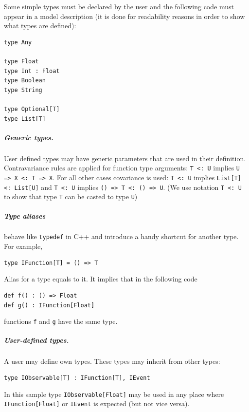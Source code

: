 \documentclass[a4paper,11pt]{article}
\begin{document}
Some simple types must be declared by the user and the following code
must appear in a model description (it is done for readability reasons
in order to show what types are defined):

\begin{verbatim}
type Any

type Float
type Int : Float
type Boolean
type String

type Optional[T]
type List[T]
\end{verbatim}

\subparagraph{Generic types.}


User defined types may have generic parameters that are used in their
definition. Contravariance rules are applied for function type
arguments: \texttt{T\,\textless{}:\,U} implies
\texttt{U\,=\textgreater{}\,X\,\textless{}:\,T\,=\textgreater{}\,X}. For all
other cases covariance is used: \texttt{T\,\textless{}:\,U} implies
\texttt{List{[}T{]}\,\textless{}:\,List{[}U{]}} and
\texttt{T\,\textless{}:\,U} implies
\texttt{()\,=\textgreater{}\,T\,\textless{}:\,()\,=\textgreater{}\,U}. (We use
notation \texttt{T\,\textless{}:\,U} to show that type \texttt{T} can be
casted to type \texttt{U})

\subparagraph{Type aliases} behave like \texttt{typedef} in C++ and introduce a handy
shortcut for another type. For example,

\begin{verbatim}
type IFunction[T] = () => T
\end{verbatim}

Alias for a type equals to it. It implies that in the following code

\begin{verbatim}
def f() : () => Float
def g() : IFunction[Float]
\end{verbatim}

functions \texttt{f} and \texttt{g} have the same type.

\subparagraph{User-defined types.}


A user may define own types. These types may inherit from other types:

\begin{verbatim}
type IObservable[T] : IFunction[T], IEvent
\end{verbatim}

In this sample type \texttt{IObservable{[}Float{]}} may be used in any
place where \texttt{IFunction{[}Float{]}} or \texttt{IEvent} is expected
(but not vice versa).
\end{document}
